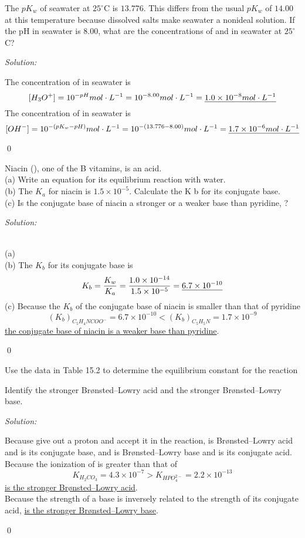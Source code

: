 \documentclass[12pt]{article}
\newenvironment{problem}[2][Problem]{\begin{trivlist}
\item[\hskip \labelsep {\bfseries #1}\hskip \labelsep {\bfseries #2.}]}{\end{trivlist}}
\newenvironment{sol}
    {\emph{Solution:}
    }
    {
    \qed
    }
\begin{document}
\begin{problem}{15.17}
The $pK_w$ of seawater at $25 ^{\circ}$C is $13.776$. This differs from the usual $pK_w$ of $14.00$ at this temperature because dissolved salts make seawater a nonideal solution. If the pH in seawater is $8.00$, what are the concentrations of  and  in seawater at $25 ^{\circ}$C?
\end{problem}
\begin{sol}
The concentration of  in seawater is
\[
[H_3O^+]=10^{-pH}mol\cdot L^{-1}=10^{-8.00}mol\cdot L^{-1}=\uline{1.0\times10^{-8}mol\cdot L^{-1}}
\]
The concentration of  in seawater is
\[
[OH^-]=10^{-(pK_w-pH)}mol\cdot L^{-1}=10^{-(13.776-8.00)}mol\cdot L^{-1}=\uline{1.7\times10^{-6}mol\cdot L^{-1}}
\]
\end{sol}

\begin{problem}{15.22}
Niacin (), one of the B vitamins, is an acid.\\
(a) Write an equation for its equilibrium reaction with water.\\
(b) The $K_a$ for niacin is $1.5\times10^{-5}$. Calculate the K b for its conjugate base.\\
(c) Is the conjugate base of niacin a stronger or a weaker base than pyridine, ?
\end{problem}
\begin{sol}
\\(a) \\
(b) The $K_b$ for its conjugate base is
\[
K_b=\frac{K_w}{K_a}=\frac{1.0\times10^{-14}}{1.5\times10^{-5}}=\uline{6.7\times10^{-10}}
\]
(c) Because the $K_b$ of the conjugate base of niacin is smaller than that of pyridine
\[
(K_b)_{C_5H_4NCOO^-}=6.7\times10^{-10}<(K_b)_{C_5H_5N}=1.7\times10^{-9}
\]
\uline{the conjugate base of niacin is a weaker base than pyridine}.
\end{sol}

\begin{problem}{15.24}
Use the data in Table 15.2 to determine the equilibrium constant for the reaction
\begin{center}
\end{center}
Identify the stronger Brønsted–Lowry acid and the stronger Brønsted–Lowry base.
\end{problem}
\begin{sol}
Because  give out a proton and  accept it in the reaction,  is Brønsted–Lowry acid and  is its conjugate base, and  is Brønsted–Lowry base and  is its conjugate acid.\\
Because the ionization of  is greater than that of 
\[
K_{H_2CO_3}=4.3\times10^{-7}>K_{HPO_4^{2-}}=2.2\times10^{-13} 
\]
\underline{ is the stronger Brønsted–Lowry acid}.\\
Because the strength of a base is inversely related to the strength of its conjugate acid, \underline{ is the stronger Brønsted–Lowry base}.
\end{sol}
\end{document}
